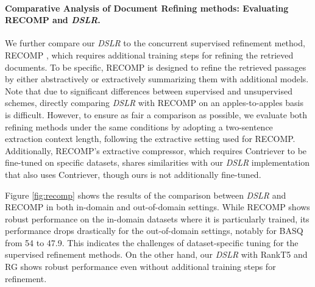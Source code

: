 

\paragraph{Comparative Analysis of Document Refining methods: Evaluating RECOMP and \textit{DSLR}.} 
We further compare our \textit{DSLR} to the concurrent supervised refinement method, RECOMP \cite{recomp}, which requires additional training steps for refining the retrieved documents.
To be specific, RECOMP is designed to refine the retrieved passages by either abstractively or extractively summarizing them with additional models.
Note that due to significant differences between supervised and unsupervised schemes, directly comparing \textit{DSLR} with RECOMP on an apples-to-apples basis is difficult.
However, to ensure as fair a comparison as possible, we evaluate both refining methods under the same conditions by adopting a two-sentence extraction context length, following the extractive setting used for RECOMP. 
Additionally, RECOMP's extractive compressor, which requires Contriever to be fine-tuned on specific datasets, shares similarities with our \textit{DSLR} implementation that also uses Contriever, though ours is not additionally fine-tuned.


Figure \ref{fig:recomp} shows the results of the comparison between \textit{DSLR} and RECOMP in both in-domain and out-of-domain settings. While RECOMP shows robust performance on the in-domain datasets where it is particularly trained, its performance drops drastically for the out-of-domain settings, notably for BASQ from 54 to 47.9. This indicates the challenges of dataset-specific tuning for the supervised refinement methods. On the other hand, our \textit{DSLR} with RankT5 and RG shows robust performance even without additional training steps for refinement.


